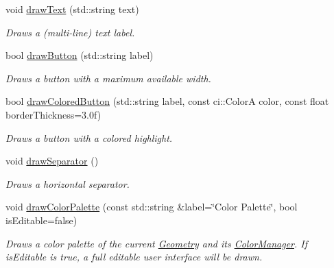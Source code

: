 \begin{DoxyCompactItemize}
\mbox{\label{classpepr3d_1_1_side_pane_ad52b2636cb54b25ed796ad8bae54a535}} 
void \mbox{\hyperlink{classpepr3d_1_1_side_pane_ad52b2636cb54b25ed796ad8bae54a535}{draw\+Text}} (std\+::string text)
\begin{DoxyCompactList}\small\item\em Draws a (multi-\/line) text label. \end{DoxyCompactList}\item 
\mbox{\label{classpepr3d_1_1_side_pane_a28107c4c4448600ef6f07b5c22928b22}} 
bool \mbox{\hyperlink{classpepr3d_1_1_side_pane_a28107c4c4448600ef6f07b5c22928b22}{draw\+Button}} (std\+::string label)
\begin{DoxyCompactList}\small\item\em Draws a button with a maximum available width. \end{DoxyCompactList}\item 
\mbox{\label{classpepr3d_1_1_side_pane_a6fcb108b3358ec5b16e08359440d2e83}} 
bool \mbox{\hyperlink{classpepr3d_1_1_side_pane_a6fcb108b3358ec5b16e08359440d2e83}{draw\+Colored\+Button}} (std\+::string label, const ci\+::\+ColorA color, const float border\+Thickness=3.\+0f)
\begin{DoxyCompactList}\small\item\em Draws a button with a colored highlight. \end{DoxyCompactList}\item 
\mbox{\label{classpepr3d_1_1_side_pane_ac9c2d073fb25be1145899accd17813fa}} 
void \mbox{\hyperlink{classpepr3d_1_1_side_pane_ac9c2d073fb25be1145899accd17813fa}{draw\+Separator}} ()
\begin{DoxyCompactList}\small\item\em Draws a horizontal separator. \end{DoxyCompactList}\item 
\mbox{\label{classpepr3d_1_1_side_pane_a33641b0bade39edf124bc6c23a6271a0}} 
void \mbox{\hyperlink{classpepr3d_1_1_side_pane_a33641b0bade39edf124bc6c23a6271a0}{draw\+Color\+Palette}} (const std\+::string \&label=\char`\"{}Color Palette\char`\"{}, bool is\+Editable=false)
\begin{DoxyCompactList}\small\item\em Draws a color palette of the current \mbox{\hyperlink{classpepr3d_1_1_geometry}{Geometry}} and its \mbox{\hyperlink{classpepr3d_1_1_color_manager}{Color\+Manager}}. If is\+Editable is true, a full editable user interface will be drawn. \end{DoxyCompactList}\item 

\end{DoxyCompactItemize}
